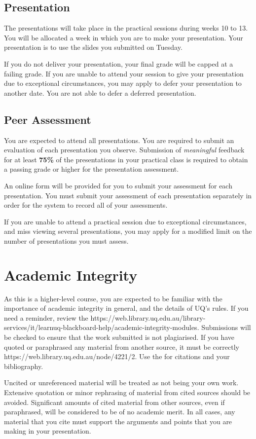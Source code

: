 \documentclass{csse4400}
\begin{document}
\subsection{Presentation}
The presentations will take place in the practical sessions during weeks 10 to 13.
You will be allocated a week in which you are to make your presentation.
Your presentation is to use the slides you submitted on Tuesday.

If you do not deliver your presentation, your final grade will be capped at a failing grade.
If you are unable to attend your session to give your presentation due to exceptional circumstances,
you may apply to defer your presentation to another date.
You are not able to defer a deferred presentation.

\subsection{Peer Assessment}
You are expected to attend all presentations.
You are required to submit an evaluation of each presentation you observe.
Submission of \emph{meaningful} feedback for at least \textbf{75\%} of the presentations in your practical class
is required to obtain a passing grade or higher for the presentation assessment.

An online form will be provided for you to submit your assessment for each presentation.
You must submit your assessment of each presentation separately in order for the system to record all of your assessments.

If you are unable to attend a practical session due to exceptional circumstances,
and miss viewing several presentations,
you may apply for a modified limit on the number of presentations you must assess.


\section{Academic Integrity}
As this is a higher-level course, you are expected to be familiar with the importance of academic integrity in general,
and the details of UQ's rules.
If you need a reminder, review the 
{https://web.library.uq.edu.au/library-services/it/learnuq-blackboard-help/academic-integrity-modules}.
Submissions will be checked to ensure that the work submitted is not plagiarised.
If you have quoted or paraphrased any material from another source, it must be correctly 
{https://web.library.uq.edu.au/node/4221/2}.
Use the  for citations and your bibliography.

Uncited or unreferenced material will be treated as not being your own work.
Extensive quotation or minor rephrasing of material from cited sources should be avoided.
Significant amounts of cited material from other sources, even if paraphrased, will be considered to be of no academic merit.
In all cases, any material that you cite must support the arguments and points that you are making in your presentation.







\end{document}
